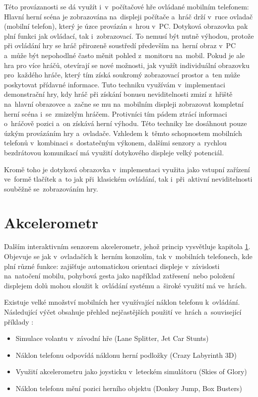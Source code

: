 \documentclass[thesis=B,czech,hidelinks]{FITthesis}[2012/06/26] %
\begin{document}
Této provázanosti se dá využít i~v~počítačové hře ovládané mobilním telefonem: Hlavní herní scéna je zobrazována na~displeji počítače a~hráč drží v~ruce ovladač (mobilní telefon), který je úzce provázán s~hrou v~PC. Dotyková obrazovka pak plní funkci jak ovládací, tak i~zobrazovací. To nemusí být nutně výhodou, protože při ovládání hry se hráč přirozeně soustředí především na~herní obraz v~PC a~může být nepohodlné často měnit pohled z~monitoru na~mobil. Pokud je ale hra pro více hráčů, otevírají se nové možnosti, jak využít individuální obrazovku pro~každého hráče, který tím získá soukromý zobrazovací prostor a~ten může poskytovat přídavné informace. Tuto techniku využívám v~implementaci demonstrační hry, kdy hráč při získání bonusu neviditelnosti zmizí z~hřiště na~hlavní obrazovce a~začne se mu na~mobilním displeji zobrazovat kompletní herní scéna i~se~zmizelým hráčem. Protivníci tím pádem ztrácí informaci o~hráčově pozici a~on získává herní výhodu. Této techniky lze dosáhnout pouze úzkým provázáním hry a~ovladače. Vzhledem k~těmto schopnostem mobilních telefonů v~kombinaci s~dostatečným výkonem, dalšími senzory a~rychlou bezdrátovou komunikací má využití dotykového displeje velký potenciál.

Kromě toho je dotyková obrazovka v~implementaci využita jako vstupní zařízení ve~formě tlačítek a~to jak při~klasickém ovládání, tak i~při~aktivní neviditelnosti souběžně se~zobrazováním hry.

\section{Akcelerometr}
\label{section:accelerometer}

Dalším interaktivním senzorem akcelerometr, jehož princip vysvětluje kapitola \ref{section:accelerometer}. Objevuje se jak v~ovladačích k~herním konzolím, tak v~mobilních telefonech, kde plní různé funkce: zajišťuje automatickou orientaci displeje v~závislosti na~natočení mobilu, pohybová gesta jako například zatřesení~nebo položení displejem dolů mohou sloužit k~ovládání systému a~široké využití má ve~hrách.

Existuje velké množství mobilních her využívající náklon telefonu k~ovládání. Následující výčet obsahuje přehled nejčastějších použití ve~hrách a~související příklady \cite{accelerometergames}:

\begin{itemize}
	\item Simulace volantu v~závodní hře (Lane Splitter, Jet Car Stunts)
	\item Náklon telefonu odpovídá náklonu herní podložky (Crazy Labyrinth 3D)
	\item Využití akcelerometru jako joysticku v~leteckém simulátoru (Skies of Glory)
	\item Náklon telefonu mění pozici herního objektu (Donkey Jump, Box Busters)
\end{itemize}
\end{document}
